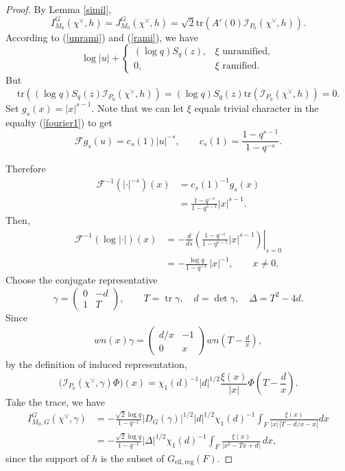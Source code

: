 \documentclass[11pt]{amsart}
\renewcommand{\rm}{\mathrm}
\theoremstyle{definition}
\numberwithin{equation}{section}
\begin{document}
\begin{proof}
    By Lemma \ref{simil}, \[I_{M_0}^G(\chi^\vee,h)=J_{M_0}^G(\chi^\vee,h)=\sqrt{2}\rm{tr}(A'(0)\mathscr{I}_{P_0}(\chi^\vee,h)).\]
    According to (\ref{unrami}) and (\ref{rami}), we have 
    \[\log|u|+\begin{cases} 
    (\log q)S_q(z),&\xi\text{ unramified},\\
    0,&\xi\text{ ramified}.\end{cases}\]
    But \[\rm{tr}((\log q)S_q(z)\mathscr{I}_{P_0}(\chi^\vee,h))=(\log q)S_q(z)\rm{tr}(\mathscr{I}_{P_0}(\chi^\vee,h))=0.\]
    Set \(g_s(x) = |x|^{s-1}.\) Note that we can let \(\xi\) equals trivial character in the equalty (\ref{fourier1}) to get
\begin{equation*}
\mathcal{F}g_s(u) = c_s(1)|u|^{-s}, \qquad c_s(1) = \frac{1 - q^{s-1}}{1 - q^{-s}}.
\end{equation*}

Therefore
\begin{equation*}
\begin{aligned}
\mathcal{F}^{-1}(|\cdot|^{-s})(x) &= c_s(1)^{-1} g_s(x) \\
&= \frac{1 - q^{-s}}{1 - q^{s-1}}|x|^{s-1}.
\end{aligned}
\end{equation*}Then, 
\[
\begin{aligned}
\mathcal F^{-1}(\log|\cdot|)(x)
&=-\left.\frac{d}{ds}
\left(\frac{1-q^{-s}}{1-q^{s-1}}|x|^{s-1}\right)\right|_{s=0}\\
&=-\frac{\log q}{1-q^{-1}}\,|x|^{-1},
\qquad x\neq0.
\end{aligned}
\]
Choose the conjugate representative
\[\gamma=\left(\begin{matrix}0&-d\\1&T\end{matrix}\right),\qquad T=\operatorname{tr}\gamma,\quad d=\det\gamma,\quad
\Delta=T^2-4d.\]
Since 
\[
\begin{aligned}
wn(x)\gamma=
\begin{pmatrix}d/x&-1\\0&x\end{pmatrix}
wn\!\left(T-\frac d x\right),
\end{aligned}
\]by the definition of induced representation, 
\[
\bigl(\mathscr I_{P_0}(\chi^\vee,\gamma)\Phi\bigr)(x)
=
\chi_1(d)^{-1}|d|^{1/2}
\frac{\xi(x)}{|x|}
\Phi\!\left(T-\frac d x\right).
\]Take the trace, we have 
\[
\begin{aligned}
I_{M_0,G}^G(\chi^\vee,\gamma)
&=
-\frac{\sqrt2\log q}{1-q^{-1}}
|D_G(\gamma)|^{1/2}|d|^{1/2}\chi_1(d)^{-1}
\int_F\frac{\xi(x)}{|x|\,|T-d/x-x|}dx\\
&=
-\frac{\sqrt2\log q}{1-q^{-1}}
|\Delta|^{1/2}\chi_1(d)^{-1}
\int_F\frac{\xi(x)}{|x^2-Tx+d|}\,dx,
\end{aligned}
\]since the support of \(h\) is the subset of \(G_{\rm{ell,reg}}(F)\).
\end{proof}
\end{document}
